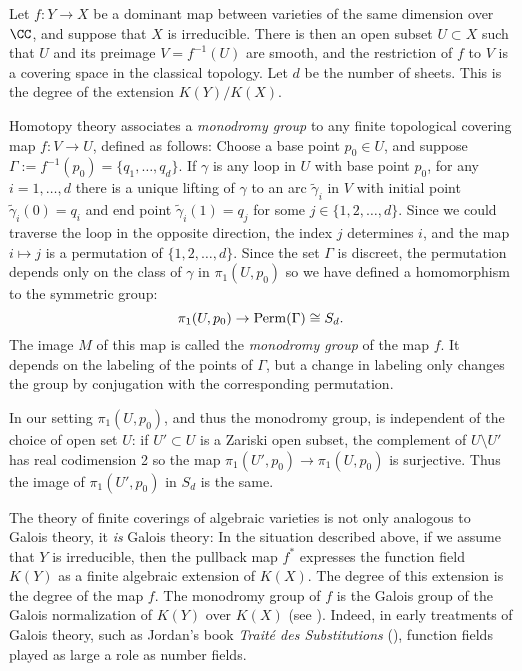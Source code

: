 Let $f : Y \to X$ be a dominant map between varieties of the same dimension over $\CC$, and suppose that $X$ is irreducible. There is then an open subset $U \subset X$ such that $U$ and 
its preimage $V = f^{-1}(U)$ are smooth, and the restriction of $f$ to $V$ is a covering space in the classical topology. Let $d$ be the number of sheets. This is the degree of the extension $K(Y)/K(X)$.

Homotopy theory  associates a \emph{monodromy group} to any finite topological covering map $f : V \to U$, defined as follows: Choose a base point $p_0 \in U$, and suppose $\Gamma := f^{-1}(p_0)  = \{q_1,\dots,q_d\}$. If $\gamma$ is any loop in $U$ with base point $p_0$, for any $i = 1, \dots, d$ there is a unique lifting of $\gamma$ to an arc $\tilde \gamma_i$ in $V$ with initial point $\tilde \gamma_i(0) = q_i$ and end point $\tilde \gamma_i(1) = q_j$ for some $j \in \{1,2,\dots,d\}$. Since we could traverse the loop in the opposite direction, the index $j$ determines $i$, and the map $i\mapsto j$ is a permutation of $\{1,2,\dots,d\}$. 
Since the set $\Gamma$ is discreet, the permutation depends only on the class of $\gamma$ in $\pi_1(U,p_0)$ so we have defined a homomorphism to the symmetric group:
$$
\pi_1(U,p_0)  \to {\rm Perm}(\Gamma) \cong S_d.
$$
The image $M$ of this map is called the \emph{monodromy group} of the map $f$. It depends on the labeling of the points of $\Gamma$, but a change in labeling
only changes the group by conjugation with the corresponding permutation. 

\begin{fact}\label{Galois equals monodromy}
In our setting $\pi_1(U,p_0)$, and thus the monodromy group, is independent of the choice of open set $U$: if $U' \subset U$ is a Zariski open subset, the complement of $U\setminus U'$ has
real codimension 2 so the map $\pi_1(U', p_0) \to \pi_1(U,p_0)$ is surjective. Thus the image of $\pi_1(U', p_0)$ in $S_d$ is the same. 

The theory of finite coverings of algebraic varieties is not only analogous to Galois theory, it \emph{is} Galois theory: In the situation described above, if we assume that $Y$ is irreducible, then the pullback map $f^*$ expresses the function field $K(Y)$ as a finite algebraic extension of $K(X)$. The degree of this extension is the degree of the map $f$. The monodromy group of $f$  is the Galois group of the Galois normalization of $K(Y)$ over $K(X)$ (see \cite{Harris1979}). Indeed, in early treatments of Galois theory, such as Jordan's book \emph{Trait\'e des Substitutions} (\cite{}), function fields played as large a role as number fields.
\end{fact}

